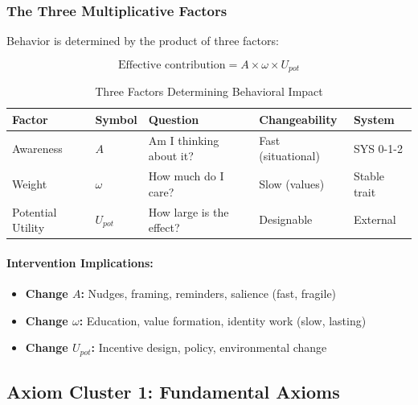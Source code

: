 \subsubsection{The Three Multiplicative Factors}

Behavior is determined by the product of three factors:

\begin{equation}
\text{Effective contribution} = A \times \omega \times U_{pot}
\end{equation}

\begin{table}[htbp]
\centering
\caption{Three Factors Determining Behavioral Impact}
\label{tab:three-factors}
\renewcommand{\arraystretch}{1.4}
\begin{tabular}{@{}lllll@{}}
\toprule
\textbf{Factor} & \textbf{Symbol} & \textbf{Question} & \textbf{Changeability} & \textbf{System} \\
\midrule
Awareness & $A$ & Am I thinking about it? & Fast (situational) & SYS 0-1-2 \\
Weight & $\omega$ & How much do I care? & Slow (values) & Stable trait \\
Potential Utility & $U_{pot}$ & How large is the effect? & Designable & External \\
\bottomrule
\end{tabular}
\end{table}

\paragraph{Intervention Implications:}
\begin{itemize}
\item \textbf{Change $A$:} Nudges, framing, reminders, salience (fast, fragile)
\item \textbf{Change $\omega$:} Education, value formation, identity work (slow, lasting)
\item \textbf{Change $U_{pot}$:} Incentive design, policy, environmental change
\end{itemize}

\subsection{Axiom Cluster 1: Fundamental Axioms}
\label{subsec:axioms-fundamental}

